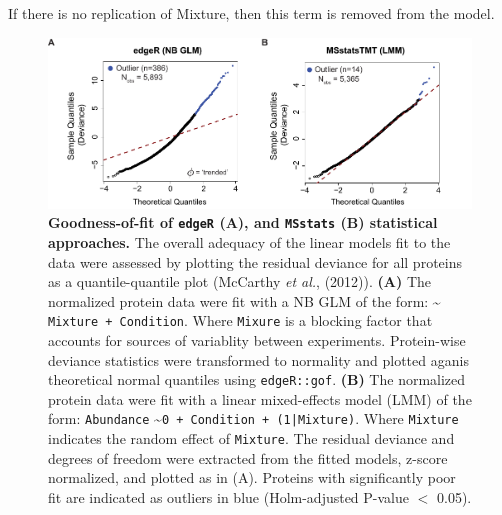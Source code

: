 \documentclass[12pt]{article}
\begin{document}
If there is no replication of Mixture, then this term is removed from the model.





\begin{figure}[!h]
	\begin{center}
		\includegraphics{fig_01}
		\caption{\textbf{Goodness-of-fit of \texttt{edgeR} (A), and 
		\texttt{MSstats} (B) statistical approaches.} The overall
		adequacy of the linear models fit to the data were assessed 
		by plotting the residual deviance for all proteins as a 
		quantile-quantile plot (McCarthy \textit{et al.}, (2012)). 
		\textbf{(A)} The normalized
		protein data were fit with a NB GLM of the form: 
		\textasciitilde{} \texttt{Mixture + Condition}.
		Where \texttt{Mixure} is a blocking factor that accounts for
		sources of variablity between experiments. Protein-wise deviance
		statistics were transformed to normality and plotted aganis
		theoretical normal quantiles using \texttt{edgeR::gof}.
		\textbf{(B)}
		The normalized protein data were fit with a linear mixed-effects 
		model (LMM) of the form: 
		\texttt{Abundance}
		\textasciitilde{}\texttt{0 + Condition + (1|Mixture)}. 
		Where \texttt{Mixture} indicates the random effect
		of \texttt{Mixture}. The residual deviance and degrees of 
		freedom were extracted from the fitted models, z-score
		normalized, and plotted as in (A). Proteins with significantly 
		poor fit are indicated as outliers in blue 
		(Holm-adjusted P-value $<$ 0.05).}
		\label{fig:gof}
	\end{center}
\end{figure}
\end{document}
